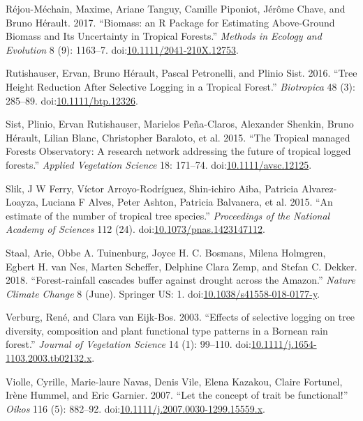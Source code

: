 \documentclass[]{elsarticle} %
\begin{document}
\hypertarget{ref-Rejou-Mechain2017}{}
Réjou-Méchain, Maxime, Ariane Tanguy, Camille Piponiot, Jérôme Chave,
and Bruno Hérault. 2017. ``Biomass: an R Package for Estimating
Above-Ground Biomass and Its Uncertainty in Tropical Forests.''
\emph{Methods in Ecology and Evolution} 8 (9): 1163--7.
doi:\href{https://doi.org/10.1111/2041-210X.12753}{10.1111/2041-210X.12753}.

\hypertarget{ref-Rutishauser2016}{}
Rutishauser, Ervan, Bruno Hérault, Pascal Petronelli, and Plinio Sist.
2016. ``Tree Height Reduction After Selective Logging in a Tropical
Forest.'' \emph{Biotropica} 48 (3): 285--89.
doi:\href{https://doi.org/10.1111/btp.12326}{10.1111/btp.12326}.

\hypertarget{ref-Sist2015}{}
Sist, Plinio, Ervan Rutishauser, Marielos Peña-Claros, Alexander
Shenkin, Bruno Hérault, Lilian Blanc, Christopher Baraloto, et al. 2015.
``The Tropical managed Forests Observatory: A research network
addressing the future of tropical logged forests.'' \emph{Applied
Vegetation Science} 18: 171--74.
doi:\href{https://doi.org/10.1111/avsc.12125}{10.1111/avsc.12125}.

\hypertarget{ref-Slik2015}{}
Slik, J W Ferry, Víctor Arroyo-Rodríguez, Shin-ichiro Aiba, Patricia
Alvarez-Loayza, Luciana F Alves, Peter Ashton, Patricia Balvanera, et
al. 2015. ``An estimate of the number of tropical tree species.''
\emph{Proceedings of the National Academy of Sciences} 112 (24).
doi:\href{https://doi.org/10.1073/pnas.1423147112}{10.1073/pnas.1423147112}.

\hypertarget{ref-Staal2018}{}
Staal, Arie, Obbe A. Tuinenburg, Joyce H. C. Bosmans, Milena Holmgren,
Egbert H. van Nes, Marten Scheffer, Delphine Clara Zemp, and Stefan C.
Dekker. 2018. ``Forest-rainfall cascades buffer against drought across
the Amazon.'' \emph{Nature Climate Change} 8 (June). Springer US: 1.
doi:\href{https://doi.org/10.1038/s41558-018-0177-y}{10.1038/s41558-018-0177-y}.

\hypertarget{ref-Verburg2003}{}
Verburg, René, and Clara van Eijk-Bos. 2003. ``Effects of selective
logging on tree diversity, composition and plant functional type
patterns in a Bornean rain forest.'' \emph{Journal of Vegetation
Science} 14 (1): 99--110.
doi:\href{https://doi.org/10.1111/j.1654-1103.2003.tb02132.x}{10.1111/j.1654-1103.2003.tb02132.x}.

\hypertarget{ref-Violle2007}{}
Violle, Cyrille, Marie-laure Navas, Denis Vile, Elena Kazakou, Claire
Fortunel, Irène Hummel, and Eric Garnier. 2007. ``Let the concept of
trait be functional!'' \emph{Oikos} 116 (5): 882--92.
doi:\href{https://doi.org/10.1111/j.2007.0030-1299.15559.x}{10.1111/j.2007.0030-1299.15559.x}.
\end{document}
